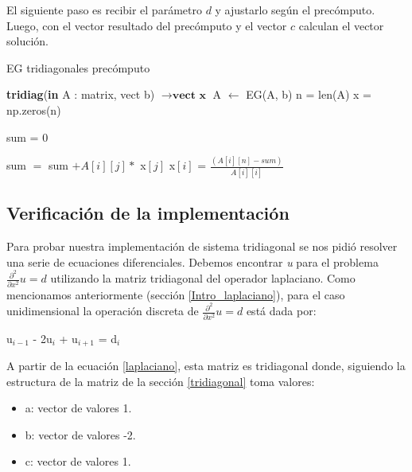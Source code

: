 El siguiente paso es recibir el parámetro $d$ y ajustarlo según el precómputo. Luego, con el vector resultado del precómputo y el vector $c$ calculan el vector solución.

\begin{algorithm}
\caption{EG tridiagonales precómputo}\label{tridiagonal_prec}
\begin{algorithmic}
\State \textbf{tridiag}(\textbf{in} A : matrix, vect b) $\to \textbf{vect x}$
 \State A $\gets$ EG(A, b) 
\State n = len(A)
\State x = np.zeros(n)

        \State sum = 0
        
                \State sum $=$ sum $+ A[i][j] *$ x$[j]$
             \EndIf       
            \State x$[i]$ = $\frac{(A[i][n] - sum)}{A[i][i]}$
        \EndFor
   \EndFor
{}
\end{algorithmic}
\end{algorithm}

\subsection{Verificación de la implementación}
Para probar nuestra implementación de sistema tridiagonal se nos pidió resolver una serie de ecuaciones diferenciales. Debemos encontrar \textit{u} para el problema $\frac{\partial^2}{\partial x^2}u = d$ utilizando la matriz tridiagonal del operador laplaciano.
Como mencionamos anteriormente (sección \ref{Intro_laplaciano}), para el caso unidimensional la operación discreta de $\frac{\partial^2}{\partial x^2}u = d$ está dada por:

u$_{i-1}$ - 2u$_{i}$ + u$_{i+1}$ = d$_{i}$

A partir de la ecuación \ref{laplaciano}, esta matriz es tridiagonal donde, siguiendo la estructura de la matriz de la sección \ref{tridiagonal} toma valores:

\begin{itemize}
    \item a: vector de valores 1.
    \item b: vector de valores -2.
    \item c: vector de valores 1.
\end{itemize}


